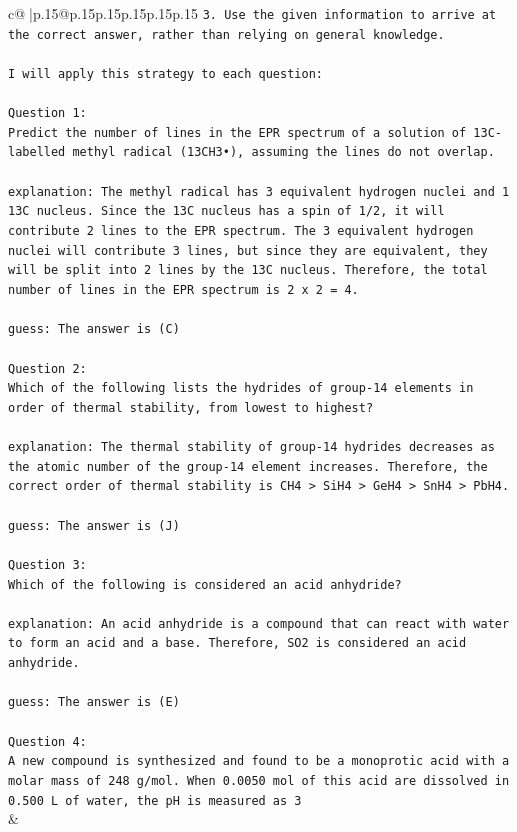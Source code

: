 \documentclass{article}
\begin{document}
{\begin{supertabular}{c@{$\;$}|p{.15\linewidth}@{}p{.15\linewidth}p{.15\linewidth}p{.15\linewidth}p{.15\linewidth}p{.15\linewidth}}
{{{\texttt{3. Use the given information to arrive at the correct answer, rather than relying on general knowledge.} \\
\\ 
\texttt{I will apply this strategy to each question:} \\
\\ 
\texttt{Question 1:} \\
\texttt{Predict the number of lines in the EPR spectrum of a solution of 13C{-}labelled methyl radical (13CH3•), assuming the lines do not overlap.} \\
\\ 
\texttt{explanation: The methyl radical has 3 equivalent hydrogen nuclei and 1 13C nucleus. Since the 13C nucleus has a spin of 1/2, it will contribute 2 lines to the EPR spectrum. The 3 equivalent hydrogen nuclei will contribute 3 lines, but since they are equivalent, they will be split into 2 lines by the 13C nucleus. Therefore, the total number of lines in the EPR spectrum is 2 x 2 = 4.} \\
\\ 
\texttt{guess: The answer is (C)} \\
\\ 
\texttt{Question 2:} \\
\texttt{Which of the following lists the hydrides of group{-}14 elements in order of thermal stability, from lowest to highest?} \\
\\ 
\texttt{explanation: The thermal stability of group{-}14 hydrides decreases as the atomic number of the group{-}14 element increases. Therefore, the correct order of thermal stability is CH4 > SiH4 > GeH4 > SnH4 > PbH4.} \\
\\ 
\texttt{guess: The answer is (J)} \\
\\ 
\texttt{Question 3:} \\
\texttt{Which of the following is considered an acid anhydride?} \\
\\ 
\texttt{explanation: An acid anhydride is a compound that can react with water to form an acid and a base. Therefore, SO2 is considered an acid anhydride.} \\
\\ 
\texttt{guess: The answer is (E)} \\
\\ 
\texttt{Question 4:} \\
\texttt{A new compound is synthesized and found to be a monoprotic acid with a molar mass of 248 g/mol. When 0.0050 mol of this acid are dissolved in 0.500 L of water, the pH is measured as 3} \\
            }
        }
    }
    & \\ \\

\end{supertabular}
}
\end{document}
